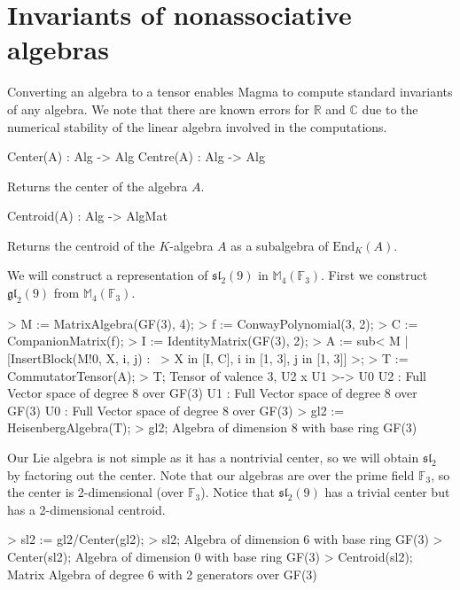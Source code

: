 
\section{Invariants of nonassociative algebras}

Converting an algebra to a tensor enables Magma to compute standard invariants of any algebra. 
We note that there are known errors for $\mathbb{R}$ and $\mathbb{C}$ due to the numerical stability of the linear algebra involved in the computations.

\begin{intrinsics}
Center(A) : Alg -> Alg
Centre(A) : Alg -> Alg
\end{intrinsics}

Returns the center of the algebra $A$.

\begin{intrinsics}
Centroid(A) : Alg -> AlgMat
\end{intrinsics}

Returns the centroid of the $K$-algebra $A$ as a subalgebra of $\text{End}_K(A)$.

\begin{example}[CenterCentroids]

We will construct a representation of $\mathfrak{sl}_2(9)$ in $\mathbb{M}_4(\mathbb{F}_3)$.
First we construct $\mathfrak{gl}_2(9)$ from $\mathbb{M}_4(\mathbb{F}_3)$.
\begin{code}
> M := MatrixAlgebra(GF(3), 4);
> f := ConwayPolynomial(3, 2);
> C := CompanionMatrix(f);
> I := IdentityMatrix(GF(3), 2);
> A := sub< M | [InsertBlock(M!0, X, i, j) : \
>     X in [I, C], i in [1, 3], j in [1, 3]] >;
> T := CommutatorTensor(A);
> T;
Tensor of valence 3, U2 x U1 >-> U0
U2 : Full Vector space of degree 8 over GF(3)
U1 : Full Vector space of degree 8 over GF(3)
U0 : Full Vector space of degree 8 over GF(3)
> gl2 := HeisenbergAlgebra(T);
> gl2;
Algebra of dimension 8 with base ring GF(3)
\end{code}

Our Lie algebra is not simple as it has a nontrivial center, so we will obtain $\mathfrak{sl}_2$ by factoring out the center.
Note that our algebras are over the prime field $\mathbb{F}_3$, so the center is 2-dimensional (over $\mathbb{F}_3$). 
Notice that $\mathfrak{sl}_2(9)$ has a trivial center but has a 2-dimensional centroid.
\begin{code}
> sl2 := gl2/Center(gl2);
> sl2;
Algebra of dimension 6 with base ring GF(3)
> Center(sl2);
Algebra of dimension 0 with base ring GF(3)
> Centroid(sl2);
Matrix Algebra of degree 6 with 2 generators over GF(3)
\end{code}
\end{example}

